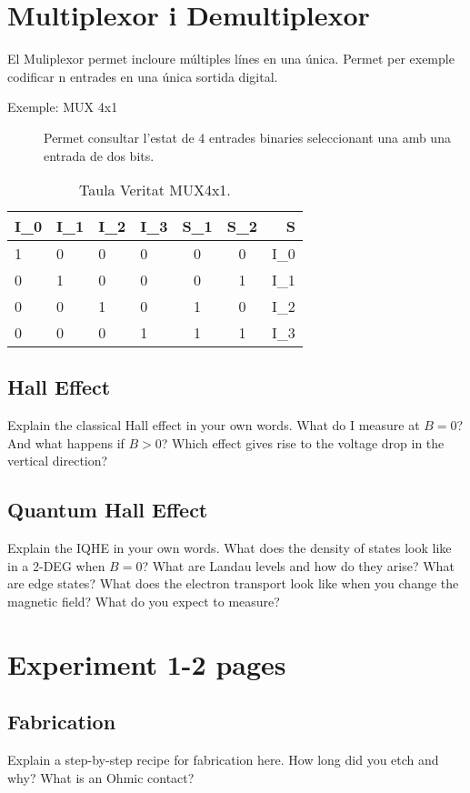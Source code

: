 \documentclass[a4paper]{article}
\begin{document}
\section{Multiplexor i Demultiplexor}
El Muliplexor permet incloure múltiples línes en una única. Permet per exemple codificar n entrades en una única sortida digital.

\begin{description}
\item[Exemple: MUX 4x1] Permet consultar l'estat de 4 entrades binaries seleccionant una amb una entrada de dos bits.
\end{description}

\begin{table}[!htbp]
\centering
\begin{tabular}{l l l l|c c|r}
I_{0} & I_{1} & I_{2} & I_{3} & S_{1} & S_{2} & S \\\hline
1&0&0&0&0&0&I_{0} \\
0&1&0&0&0&1&I_{1} \\
0&0&1&0&1&0&I_{2} \\
0&0&0&1&1&1&I_{3} \\

\end{tabular}
\caption{\label{tab:widgets}Taula Veritat MUX4x1.}
\end{table}

\subsection{Hall Effect}
Explain the classical Hall effect in your own words. What do I measure at $B=0$? And what happens if $B>0$? Which effect gives rise to the voltage drop in the vertical direction?

\subsection{Quantum Hall Effect}
Explain the IQHE in your own words. What does the density of states look like in a 2-DEG when $B=0$? What are Landau levels and how do they arise? What are edge states? What does the electron transport look like when you change the magnetic field? What do you expect to measure?

\section{Experiment 1-2 pages}
\subsection{Fabrication}
Explain a step-by-step recipe for fabrication here. How long did you etch and why? What is an Ohmic contact?
\end{document}
